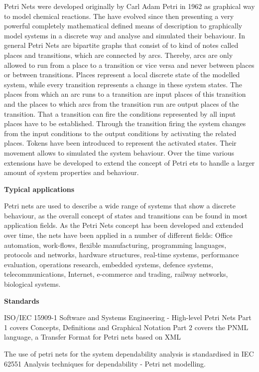 \documentclass{./template/openetcs_report}
\begin{document}
Petri Nets were developed originally by Carl Adam Petri in 1962 as graphical way to model chemical reactions. The have evolved since then presenting a very powerful completely mathematical defined means of description to graphically model systems in a discrete way and analyse and simulated their behaviour. 
In general Petri Nets are bipartite graphs  that consist of to kind of notes called places and transitions, which are connected by arcs. Thereby, arcs are only allowed to run from a place to a transition or vice versa and never between places or between transitions. Places represent a local discrete state of the modelled system, while every transition represents a change in these system states. The places from which an arc runs to a transition are input places of this transition and the places to which arcs from the transition run are output places of the transition. That a transition can fire the conditions represented by all input places have to be established. Through the transition firing the system changes from the input conditions to the output conditions by activating the related places. Tokens have been introduced to represent the activated states. Their movement allows to simulated the system behaviour. Over the time various extensions have be developed to extend the concept of Petri ets to handle a larger amount of system properties and  behaviour. 

	\textbf{Typical applications}

Petri nets are used to describe a wide range of systems that show a discrete behaviour, as the overall concept of states and transitions can be found in most application fields. As the Petri Nets concept has been developed and extended over time, the nets have been applied in a number of different fields: Office automation, work-flows, flexible manufacturing, programming languages, protocols and networks, hardware structures, real-time systems, performance evaluation, operations research, embedded systems, defence systems, telecommunications, Internet, e-commerce and trading, railway networks, biological systems.

	\textbf{Standards}

ISO/IEC 15909-1 Software and Systems Engineering - High-level Petri Nets
Part 1 covers Concepts, Definitions and Graphical Notation
Part 2 covers the PNML language, a Transfer Format for Petri nets based on XML

The use of petri nets for the system dependability analysis is standardised in IEC 62551 Analysis techniques for dependability - Petri net modelling.
\end{document}

